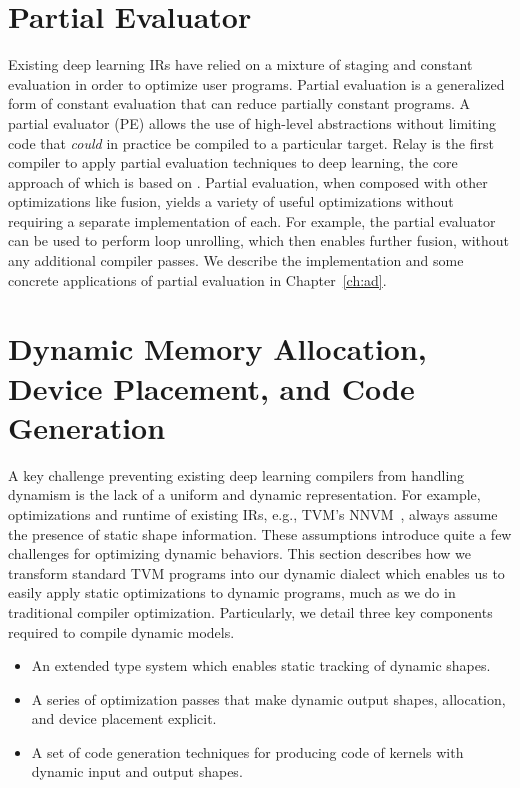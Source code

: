 \section{Partial Evaluator}
\label{sec:t formartial_eval}
Existing deep learning IRs have relied on
  a mixture of staging and constant evaluation
  in order to optimize user programs.
Partial evaluation is a generalized form of constant
  evaluation that can reduce partially constant
  programs.
A partial evaluator (PE) allows the use of high-level abstractions
  without limiting code that \textit{could} in practice be
  compiled to a particular target.
Relay is the first compiler to apply partial evaluation
  techniques to deep learning, the
  core approach of which is based on \citep{pe_ref}.
Partial evaluation, when composed with other
  optimizations like fusion, yields a variety
  of useful optimizations without requiring
  a separate implementation of each.
For example, the partial evaluator can be used to perform
  loop unrolling, which then enables further fusion,
  without any additional compiler passes.
We describe the implementation and some
  concrete applications of partial evaluation
  in Chapter~\ref{ch:ad}.

\section{Dynamic Memory Allocation, Device Placement, and Code Generation}

A key challenge preventing existing deep learning compilers from handling dynamism
  is the lack of a uniform and dynamic representation.
For example, optimizations and runtime of existing IRs,
  e.g., TVM's NNVM~\citep{tvm_osdi18}, always assume the presence of static shape information.
These assumptions introduce quite a few challenges for optimizing dynamic behaviors.
This section describes how we transform standard TVM programs into our dynamic dialect
  which enables us to easily apply static optimizations to dynamic programs, much as we
  do in traditional compiler optimization.
Particularly, we detail three key components required to compile dynamic models.

\begin{itemize}
    \item An extended type system which enables static tracking of dynamic shapes.
    \item A series of optimization passes that make dynamic output shapes, allocation, and device placement explicit.
    \item A set of code generation techniques for producing code of kernels with dynamic input and output shapes.
\end{itemize}

